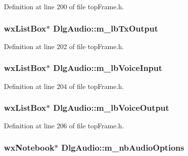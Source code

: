 Definition at line 200 of file top\-Frame.\-h.

\hypertarget{class_dlg_audio_a7a15f882dd0791867d7284cc4b043ca2}{
\subsubsection[{m\-\_\-lb\-Tx\-Output}]{\setlength{\rightskip}{0pt plus 5cm}wx\-List\-Box$\ast$ Dlg\-Audio\-::m\-\_\-lb\-Tx\-Output\hspace{0.3cm}{\ttfamily [protected]}}}\label{class_dlg_audio_a7a15f882dd0791867d7284cc4b043ca2}


Definition at line 202 of file top\-Frame.\-h.

\hypertarget{class_dlg_audio_a022070976a0bc9ffb78bea4298f759aa}{
\subsubsection[{m\-\_\-lb\-Voice\-Input}]{\setlength{\rightskip}{0pt plus 5cm}wx\-List\-Box$\ast$ Dlg\-Audio\-::m\-\_\-lb\-Voice\-Input\hspace{0.3cm}{\ttfamily [protected]}}}\label{class_dlg_audio_a022070976a0bc9ffb78bea4298f759aa}


Definition at line 204 of file top\-Frame.\-h.

\hypertarget{class_dlg_audio_a75f209f62dd213b4236624f019f611e1}{
\subsubsection[{m\-\_\-lb\-Voice\-Output}]{\setlength{\rightskip}{0pt plus 5cm}wx\-List\-Box$\ast$ Dlg\-Audio\-::m\-\_\-lb\-Voice\-Output\hspace{0.3cm}{\ttfamily [protected]}}}\label{class_dlg_audio_a75f209f62dd213b4236624f019f611e1}


Definition at line 206 of file top\-Frame.\-h.

\hypertarget{class_dlg_audio_ac45627cdbbcdaa2e3400c08f6fe9cfe6}{
\subsubsection[{m\-\_\-nb\-Audio\-Options}]{\setlength{\rightskip}{0pt plus 5cm}wx\-Notebook$\ast$ Dlg\-Audio\-::m\-\_\-nb\-Audio\-Options\hspace{0.3cm}{\ttfamily [protected]}}}\label{class_dlg_audio_ac45627cdbbcdaa2e3400c08f6fe9cfe6}


